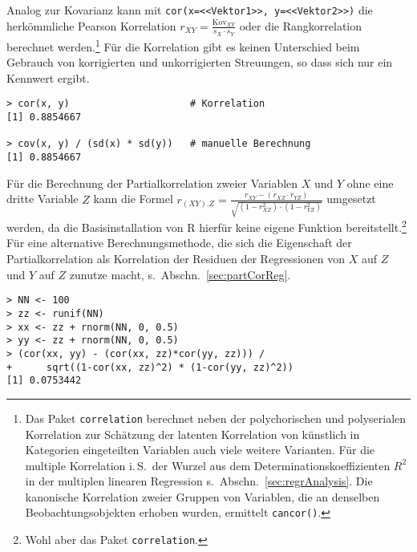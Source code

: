 Analog zur Kovarianz kann mit \lstinline!cor(x=<<Vektor1>>, y=<<Vektor2>>)! die herkömmliche Pearson Korrelation $r_{XY} = \frac{\text{Kov}_{XY}}{s_{X} \cdot s_{Y}}$ oder die Rangkorrelation berechnet werden.\footnote{\label{ftn:polycor}Das Paket \lstinline!correlation! \cite{Makowski2024} berechnet neben der polychorischen und polyserialen Korrelation zur Schätzung der latenten Korrelation von künstlich in Kategorien eingeteilten Variablen auch viele weitere Varianten. Für die multiple Korrelation i.\,S.\ der Wurzel aus dem Determinationskoeffizienten $R^{2}$ in der multiplen linearen Regression s.\ Abschn.\ \ref{sec:regrAnalysis}. Die kanonische Korrelation zweier Gruppen von Variablen, die an denselben Beobachtungsobjekten erhoben wurden, ermittelt \lstinline!cancor()!.} Für die Korrelation gibt es keinen Unterschied beim Gebrauch von korrigierten und unkorrigierten Streuungen, so dass sich nur ein Kennwert ergibt.
\begin{lstlisting}
> cor(x, y)                     # Korrelation
[1] 0.8854667

> cov(x, y) / (sd(x) * sd(y))   # manuelle Berechnung
[1] 0.8854667
\end{lstlisting}

Für die Berechnung der Partialkorrelation zweier Variablen $X$ und $Y$ ohne eine dritte Variable $Z$ kann die Formel $r_{(XY).Z} = \frac{r_{XY} - (r_{XZ} \cdot r_{YZ})}{\sqrt{(1-r_{XZ}^{2}) \cdot (1-r_{YZ}^{2})}}$ umgesetzt werden, da die Basisinstallation von R hierfür keine eigene Funktion bereitstellt.\footnote{Wohl aber das Paket \lstinline!correlation!.} Für eine alternative Berechnungsmethode, die sich die Eigenschaft der Partialkorrelation als Korrelation der Residuen der Regressionen von $X$ auf $Z$ und $Y$ auf $Z$ zunutze macht, s.\ Abschn.\ \ref{sec:partCorReg}.
\begin{lstlisting}
> NN <- 100
> zz <- runif(NN)
> xx <- zz + rnorm(NN, 0, 0.5)
> yy <- zz + rnorm(NN, 0, 0.5)
> (cor(xx, yy) - (cor(xx, zz)*cor(yy, zz))) /
+      sqrt((1-cor(xx, zz)^2) * (1-cor(yy, zz)^2))
[1] 0.0753442
\end{lstlisting}

